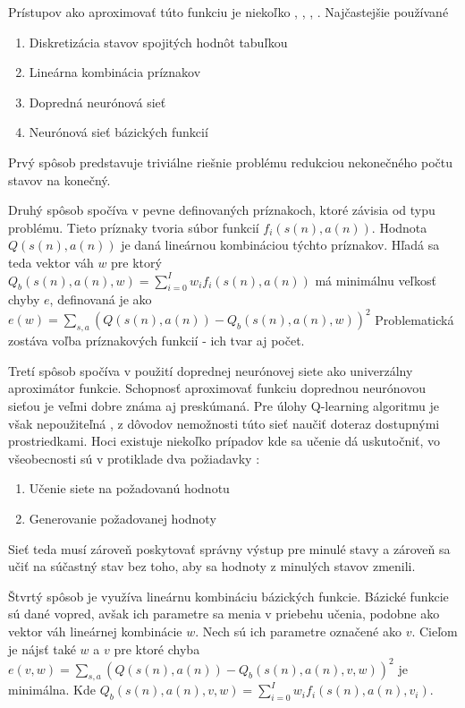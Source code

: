 Prístupov ako aproximovať túto funkciu je niekoľko \cite{bib:aproximation_01},
\cite{bib:aproximation_02}, \cite{bib:aproximation_03}, \cite{bib:aproximation_04}.
Najčastejšie používané
\begin{enumerate}
  \item Diskretizácia stavov spojitých hodnôt tabuľkou
  \item Lineárna kombinácia príznakov
  \item Dopredná neurónová sieť
  \item Neurónová sieť bázických funkcií
\end{enumerate}

Prvý spôsob predstavuje triviálne riešnie problému redukciou nekonečného
počtu stavov na konečný.

Druhý spôsob spočíva v pevne definovaných príznakoch, ktoré závisia od typu
problému. Tieto príznaky tvoria súbor funkcií $f_{i}(s(n),a(n))$. Hodnota $Q(s(n), a(n))$
je daná lineárnou kombináciou týchto príznakov. Hľadá sa teda vektor váh
$w$ pre ktorý  $Q_b(s(n), a(n), w) = \sum\limits_{i=0}^{I}w_i f_{i}(s(n),a(n))$
má minimálnu veľkosť chyby $e$, definovaná je ako
$e(w) = \sum\limits_{s,a} (Q(s(n), a(n))- Q_b(s(n), a(n), w))^2$
Problematická zostáva voľba príznakových funkcií - ich tvar aj počet.

Tretí spôsob spočíva v použití doprednej neurónovej siete ako univerzálny aproximátor funkcie.
Schopnosť aproximovať funkciu doprednou neurónovou sieťou je veľmi dobre známa aj preskúmaná.
Pre úlohy Q-learning algoritmu je však nepoužiteľná \cite{bib:q_fnn_problem},
z dôvodov nemožnosti túto sieť naučiť doteraz dostupnými prostriedkami. Hoci existuje niekoľko prípadov kde sa učenie dá
uskutočniť, vo všeobecnosti sú v protiklade dva požiadavky :
\begin{enumerate}
  \item Učenie siete na požadovanú hodnotu
  \item Generovanie požadovanej hodnoty
\end{enumerate}

Sieť teda musí zároveň poskytovať správny výstup pre minulé stavy a zároveň sa
učiť na súčastný stav bez toho, aby sa hodnoty z minulých stavov zmenili.

Štvrtý spôsob je využíva lineárnu kombináciu bázických funkcie.
Bázické funkcie sú dané vopred, avšak ich parametre sa menia v priebehu učenia,
podobne ako vektor váh lineárnej kombinácie $w$. Nech sú ich parametre označené
ako $v$. Cieľom je nájsť také $w$ a $v$ pre ktoré chyba
$e(v, w) = \sum\limits_{s,a}(Q(s(n), a(n))- Q_b(s(n), a(n), v, w))^2$
je minimálna. Kde $Q_b(s(n), a(n), v, w) = \sum\limits_{i=0}^{I}w_i f_{i}(s(n),a(n), v_i)$.

